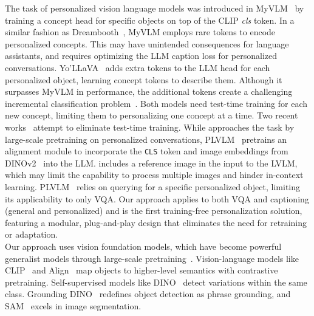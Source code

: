 The task of personalized vision language models was introduced in MyVLM~\cite{alaluf2024myvlm} by training a concept head for specific objects on top of the CLIP \textit{cls} token. In a similar fashion as Dreambooth~\cite{ruiz2023dreambooth}, MyVLM employs rare tokens to encode personalized concepts. This may have unintended consequences for language assistants, and requires optimizing the LLM caption loss for personalized conversations. Yo'LLaVA~\cite{nguyen2024yo} adds extra tokens to the LLM head for each personalized object, learning concept tokens to describe them. Although it surpasses MyVLM in performance, the additional tokens create a challenging incremental classification problem~\cite{de2021continual}. Both models need test-time training for each new concept, limiting them to personalizing one concept at a time. Two recent works~\cite{hao2024rememberretrievegenerateunderstanding,pham2024personalizedlargevisionlanguagemodels} attempt to eliminate test-time training. While \citet{hao2024rememberretrievegenerateunderstanding} approaches the task by large-scale pretraining on personalized conversations, PLVLM~\cite{pham2024personalizedlargevisionlanguagemodels} pretrains an alignment module to incorporate the \texttt{CLS} token and image  embeddings from DINOv2~\cite{oquab2023dinov2} into the LLM. \citet{hao2024rememberretrievegenerateunderstanding} includes a reference image in the input to the LVLM, which may limit the capability to process multiple images and hinder in-context learning.
PLVLM~\cite{pham2024personalizedlargevisionlanguagemodels} relies on querying for a specific personalized object, limiting its applicability to only VQA. Our approach applies to both VQA and captioning (general and personalized) and is the first training-free personalization solution, featuring a modular, plug-and-play design that eliminates the need for retraining or adaptation.\\
 Our approach uses vision foundation models, which have become powerful generalist models through large-scale pretraining~\cite{bommasani2021opportunities}. Vision-language models like CLIP~\cite{radford2021learning} and Align~\cite{jia2021scaling} map objects to higher-level semantics with contrastive pretraining. Self-supervised models like DINO~\cite{caron2021emerging,oquab2023dinov2} detect variations within the same class. Grounding DINO~\cite{liu2023grounding} redefines object detection as phrase grounding, and SAM~\cite{kirillov2023segment} excels in image segmentation.\\
